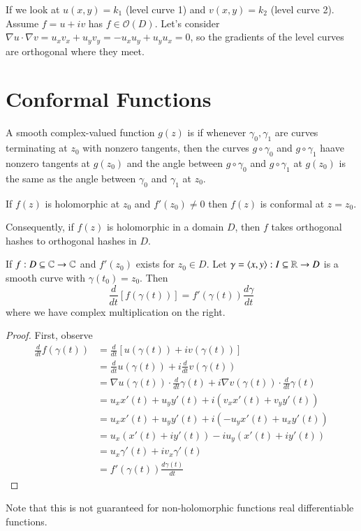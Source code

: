 If we look at $u(x,y) = k_1$ (level curve 1) and $v(x,y) = k_2$ (level curve 2). Assume $f = u+iv$ has $f \in \mathcal{O}(D)$. Let's consider $\nabla u \cdot \nabla v = u_xv_x+u_yv_y = -u_xu_y+u_yu_x = 0$, so the gradients of the level curves are orthogonal where they meet. 


\section{Conformal Functions}




\begin{definition}
    A smooth complex-valued function $g(z)$ is  if whenever $\gamma_0, \gamma_1$ are curves terminating at $z_0$ with nonzero tangents, then the curves $g \circ \gamma_0$ and $g \circ \gamma_1$ haave nonzero tangents at $g(z_0)$ and the angle between $g\circ \gamma_0$ and $g\circ \gamma_1$ at $g(z_0)$ is the same as the angle between $\gamma_0$ and $\gamma_1$ at $z_0$. 
\end{definition}

\begin{theorem}
    If $f(z)$ is holomorphic at $z_0$ and $f'(z_0) \neq 0$ then $f(z)$ is conformal at $z = z_0$.
\end{theorem}


Consequently, if $f(z)$ is holomorphic in a domain $D$, then $f$ takes orthogonal hashes to orthogonal hashes in $D$.

\begin{proposition}
    If $f:D\subseteq \mathbb C\rightarrow \mathbb C$ and $f'(z_0)$ exists for $z_0 \in D$. Let $\gamma = \langle x,y\rangle:I\subseteq \mathbb R\rightarrow D$ is a smooth curve with $\gamma(t_0) = z_0$. Then \begin{equation*}
        \frac{d}{dt}\left[f(\gamma(t))\right] = f'(\gamma(t))\frac{d\gamma}{dt}
    \end{equation*}
    where we have complex multiplication on the right.
\end{proposition}
\begin{proof}
    First, observe \begin{align*}
        \frac{d}{dt}f(\gamma(t)) &= \frac{d}{dt}\left[u(\gamma(t)) + iv(\gamma(t))\right] \\
        &= \frac{d}{dt}u(\gamma(t)) + i\frac{d}{dt}v(\gamma(t)) \tag{by linearity} \\
        &= \nabla u(\gamma(t))\cdot \frac{d}{dt}\gamma(t)+i\nabla v(\gamma(t))\cdot \frac{d}{dt}\gamma(t) \\
        &= u_xx'(t)+u_yy'(t)+i(v_xx'(t)+v_yy'(t)) \tag{for $\gamma(t) = \langle x(t),y(t)\rangle$}  \\
        &= u_xx'(t)+u_yy'(t)+i(-u_yx'(t)+u_xy'(t)) \\
        &= u_x(x'(t)+iy'(t))-iu_y(x'(t) + iy'(t)) \\
        &= u_x\gamma'(t)+iv_x\gamma'(t) \\
        &= f'(\gamma(t))\frac{d\gamma(t)}{dt}
    \end{align*}
\end{proof}
Note that this is not guaranteed for non-holomorphic functions real differentiable functions. 

